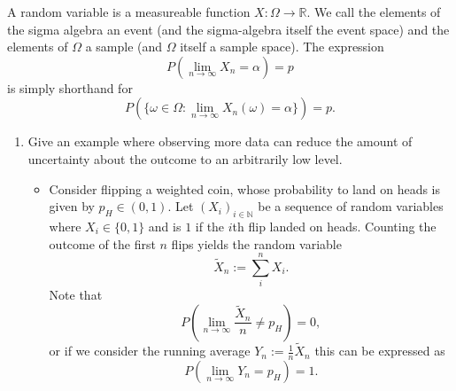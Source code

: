 \documentclass{article}
\begin{document}
A random variable is a measureable function $X : \Omega \rightarrow \mathbb{R}$. We call the elements of the sigma algebra an event (and the sigma-algebra itself the event space) and the elements of $\Omega$ a sample (and $\Omega$ itself a sample space). The expression
$$
P\left(\lim_{n \rightarrow \infty} X_n = \alpha\right) = p
$$
is simply shorthand for
$$
P\left(\{\omega \in \Omega : \lim_{n \rightarrow \infty} X_n(\omega) = \alpha\}\right) = p.
$$
\begin{enumerate}
	\item Give an example where observing more data can reduce the amount of uncertainty about the outcome to an arbitrarily low level.
	\begin{itemize}
		\item Consider flipping a weighted coin, whose probability to land on heads is given by $p_H \in (0, 1)$. Let $(X_i)_{i \in \mathbb{N}}$ be a sequence of random variables where $X_i \in \{0, 1\}$ and is $1$ if the $i$th flip landed on heads. Counting the outcome of the first $n$ flips yields the random variable
		$$
		\tilde{X}_n := \sum_{i}^n X_i.
		$$
		Note that
		$$
		P\left(\lim_{n \rightarrow \infty} \frac{\tilde{X}_n}{n} \neq p_H\right) = 0,
		$$
		or if we consider the running average $Y_n := \frac{1}{n} \tilde{X}_n$ this can be expressed as
		$$
		P\left(\lim_{n \rightarrow \infty} Y_n = p_H\right) = 1.
		$$
	\end{itemize}


\end{enumerate}
\end{document}
